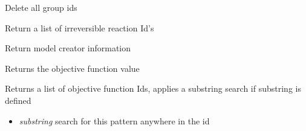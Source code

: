\documentclass[a4paper,11pt,english]{sphinxmanual}
\begin{document}
\begin{fulllineitems}
\begin{fulllineitems}
\end{fulllineitems}


\begin{fulllineitems}
\label{modules_doc:cbmpy.CBModel.Model.getGroupIds}
Delete all group ids

\end{fulllineitems}


\begin{fulllineitems}
\label{modules_doc:cbmpy.CBModel.Model.getIrreversibleReactionIds}
Return a list of irreversible reaction Id's

\end{fulllineitems}


\begin{fulllineitems}
\label{modules_doc:cbmpy.CBModel.Model.getModelCreators}
Return model creator information

\end{fulllineitems}


\begin{fulllineitems}
\label{modules_doc:cbmpy.CBModel.Model.getObjFuncValue}
Returns the objective function value

\end{fulllineitems}


\begin{fulllineitems}
\label{modules_doc:cbmpy.CBModel.Model.getObjectiveIds}
Returns a list of objective function Ids, applies a substring search if substring is defined
\begin{itemize}
\item {} 
\emph{substring} search for this pattern anywhere in the id

\end{itemize}


\end{fulllineitems}
\end{fulllineitems}
\end{document}
